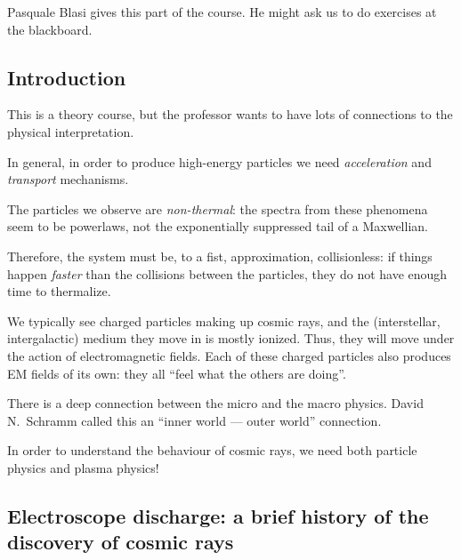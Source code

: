 \documentclass[main.tex]{subfiles}
\begin{document}

Pasquale Blasi gives this part of the course. 
He might ask us to do exercises at the blackboard. 

\subsection*{Introduction}

This is a theory course, but the professor wants to have lots of connections to the physical interpretation.

In general, in order to produce high-energy particles we need \emph{acceleration} and \emph{transport} mechanisms. 

The particles we observe are \emph{non-thermal}: 
the spectra from these phenomena seem to be powerlaws, not 
the exponentially suppressed tail of a Maxwellian.

Therefore, the system must be, to a fist, approximation, collisionless: if things happen \emph{faster} than the collisions between the particles, they do not have enough time to thermalize.

We typically see charged particles making up cosmic rays, 
and the (interstellar, intergalactic) medium they move in is mostly ionized. 
Thus, they will move under the action of electromagnetic fields. 
Each of these charged particles also produces EM fields of its own: they all ``feel what the others are doing''.

There is a deep connection between the micro and the macro physics. 
David N.\ Schramm called this an ``inner world --- outer world'' connection. 

In order to understand the behaviour of cosmic rays, we need both particle physics and plasma physics! 


\subsection*{Electroscope discharge: a brief history of the discovery of cosmic rays}
\end{document}
